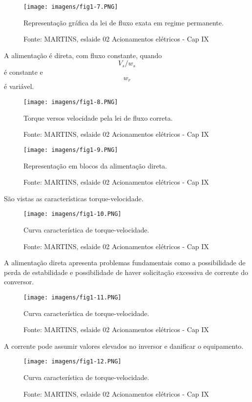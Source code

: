 \begin{figure}[ht!]
\center
\texttt{[image: imagens/fig1-7.PNG]}
\caption{\label{fig:fig1.7}Representação gráfica da lei de fluxo exata em regime permanente.}
\caption*{Fonte: MARTINS, eslaide 02 Acionamentos elétricos - Cap IX}
\end{figure}

A alimentação é direta, com fluxo constante, quando \[V_{s}/w_{s}\] é constante e \[w_{r}\] é variável.

\begin{figure}[ht!]
\center
\texttt{[image: imagens/fig1-8.PNG]}
\caption{\label{fig:fig1.8}Torque versos velocidade pela lei de fluxo correta.}
\caption*{Fonte: MARTINS, eslaide 02 Acionamentos elétricos - Cap IX}
\end{figure}

\begin{figure}[ht!]
\center
\texttt{[image: imagens/fig1-9.PNG]}
\caption{\label{fig:fig1.9}Representação em blocos da alimentação direta.}
\caption*{Fonte: MARTINS, eslaide 02 Acionamentos elétricos - Cap IX}
\end{figure}

São vistas as características torque-velocidade.

\begin{figure}[ht!]
\center
\texttt{[image: imagens/fig1-10.PNG]}
\caption{\label{fig:fig1-10}Curva característica de torque-velocidade.}
\caption*{Fonte: MARTINS, eslaide 02 Acionamentos elétricos - Cap IX}
\end{figure}

A alimentação direta apresenta problemas fundamentais como a possibilidade de perda de estabilidade e possibilidade de haver solicitação excessiva de corrente do conversor.

\begin{figure}[ht!]
\center
\texttt{[image: imagens/fig1-11.PNG]}
\caption{\label{fig:fig1-11} Curva característica de torque-velocidade.}
\caption*{Fonte: MARTINS, eslaide 02 Acionamentos elétricos - Cap IX}
\end{figure}

A corrente pode assumir valores elevados no inversor e danificar o equipamento.

\begin{figure}[ht!]
\center
\texttt{[image: imagens/fig1-12.PNG]}
\caption{\label{fig:fig1-12}Curva característica de torque-velocidade.}
\caption*{Fonte: MARTINS, eslaide 02 Acionamentos elétricos - Cap IX}
\end{figure}


